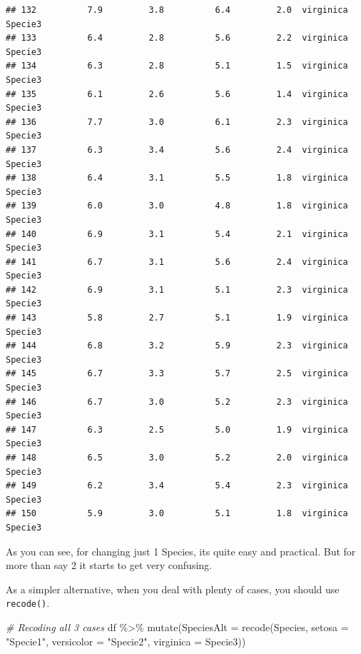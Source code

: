 \documentclass[
]{book}
\newenvironment{Shaded}{\begin{snugshade}}{\end{snugshade}}
\newcommand{\AttributeTok}[1]{\textcolor[rgb]{0.77,0.63,0.00}{#1}}
\newcommand{\CommentTok}[1]{\textcolor[rgb]{0.56,0.35,0.01}{\textit{#1}}}
\newcommand{\FunctionTok}[1]{\textcolor[rgb]{0.00,0.00,0.00}{#1}}
\newcommand{\NormalTok}[1]{#1}
\newcommand{\SpecialCharTok}[1]{\textcolor[rgb]{0.00,0.00,0.00}{#1}}
\newcommand{\StringTok}[1]{\textcolor[rgb]{0.31,0.60,0.02}{#1}}
\begin{document}
\begin{verbatim}
## 132          7.9         3.8          6.4         2.0  virginica    Specie3
## 133          6.4         2.8          5.6         2.2  virginica    Specie3
## 134          6.3         2.8          5.1         1.5  virginica    Specie3
## 135          6.1         2.6          5.6         1.4  virginica    Specie3
## 136          7.7         3.0          6.1         2.3  virginica    Specie3
## 137          6.3         3.4          5.6         2.4  virginica    Specie3
## 138          6.4         3.1          5.5         1.8  virginica    Specie3
## 139          6.0         3.0          4.8         1.8  virginica    Specie3
## 140          6.9         3.1          5.4         2.1  virginica    Specie3
## 141          6.7         3.1          5.6         2.4  virginica    Specie3
## 142          6.9         3.1          5.1         2.3  virginica    Specie3
## 143          5.8         2.7          5.1         1.9  virginica    Specie3
## 144          6.8         3.2          5.9         2.3  virginica    Specie3
## 145          6.7         3.3          5.7         2.5  virginica    Specie3
## 146          6.7         3.0          5.2         2.3  virginica    Specie3
## 147          6.3         2.5          5.0         1.9  virginica    Specie3
## 148          6.5         3.0          5.2         2.0  virginica    Specie3
## 149          6.2         3.4          5.4         2.3  virginica    Specie3
## 150          5.9         3.0          5.1         1.8  virginica    Specie3
\end{verbatim}

As you can see, for changing just 1 Species, its quite easy and practical.
But for more than say 2 it starts to get very confusing.

As a simpler alternative, when you deal with plenty of cases, you should use \texttt{recode()}.

\begin{Shaded}
\begin{Highlighting}[]
\CommentTok{\# Recoding all 3 cases}
\NormalTok{df }\SpecialCharTok{\%\textgreater{}\%} 
  \FunctionTok{mutate}\NormalTok{(}\AttributeTok{SpeciesAlt =} \FunctionTok{recode}\NormalTok{(Species, }\AttributeTok{setosa =} \StringTok{"Specie1"}\NormalTok{,}
                             \AttributeTok{versicolor =} \StringTok{"Specie2"}\NormalTok{, }
                             \AttributeTok{virginica =} \StringTok{\textquotesingle{}Specie3\textquotesingle{}}\NormalTok{))}
\end{Highlighting}
\end{Shaded}
\end{document}
